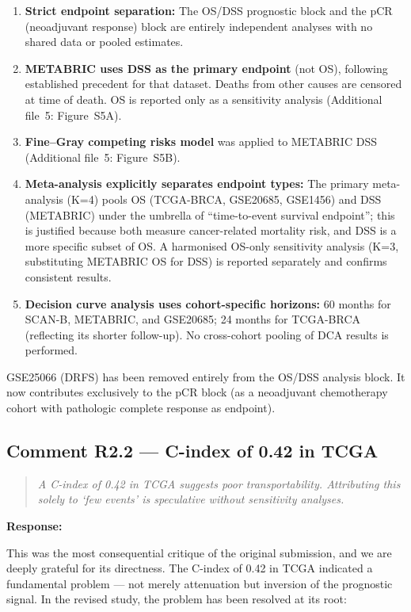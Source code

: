 \documentclass[11pt]{article}
\newcommand{\reviewerquote}[1]{\begin{quote}\itshape #1\end{quote}}
\begin{document}
\begin{enumerate}
  \item \textbf{Strict endpoint separation:} The OS/DSS prognostic block and the pCR (neoadjuvant response) block are entirely independent analyses with no shared data or pooled estimates.
  \item \textbf{METABRIC uses DSS as the primary endpoint} (not OS), following established precedent for that dataset. Deaths from other causes are censored at time of death. OS is reported only as a sensitivity analysis (Additional file~5: Figure~S5A).
  \item \textbf{Fine--Gray competing risks model} was applied to METABRIC DSS (Additional file~5: Figure~S5B).
  \item \textbf{Meta-analysis explicitly separates endpoint types:} The primary meta-analysis (K=4) pools OS (TCGA-BRCA, GSE20685, GSE1456) and DSS (METABRIC) under the umbrella of ``time-to-event survival endpoint''; this is justified because both measure cancer-related mortality risk, and DSS is a more specific subset of OS. A harmonised OS-only sensitivity analysis (K=3, substituting METABRIC OS for DSS) is reported separately and confirms consistent results.
  \item \textbf{Decision curve analysis uses cohort-specific horizons:} 60 months for SCAN-B, METABRIC, and GSE20685; 24 months for TCGA-BRCA (reflecting its shorter follow-up). No cross-cohort pooling of DCA results is performed.
\end{enumerate}

GSE25066 (DRFS) has been removed entirely from the OS/DSS analysis block. It now contributes exclusively to the pCR block (as a neoadjuvant chemotherapy cohort with pathologic complete response as endpoint).

\subsection*{Comment R2.2 --- C-index of 0.42 in TCGA}

\reviewerquote{A C-index of 0.42 in TCGA suggests poor transportability. Attributing this solely to `few events' is speculative without sensitivity analyses.}

\noindent\textbf{Response:}

This was the most consequential critique of the original submission, and we are deeply grateful for its directness. The C-index of 0.42 in TCGA indicated a fundamental problem --- not merely attenuation but inversion of the prognostic signal. In the revised study, the problem has been resolved at its root:
\end{document}
